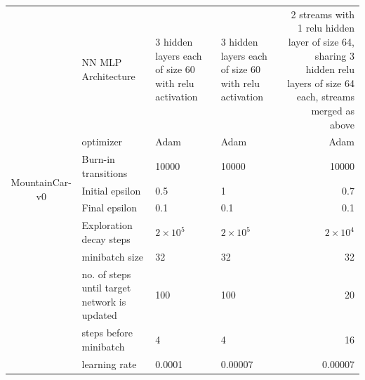 \documentclass[12pt]{article}
\begin{document}
\begin{tcolorbox}[fit,height=22cm, width=\textwidth, blank, borderline={1pt}{-2pt},nobeforeafter]
\begin{table}[H]
\begin{tabular}{|c|p{7.785em}|l|l|r|}
			\hline
			\multirow{10}[20]{*}{\begin{sideways}MountainCar-v0\end{sideways}} & NN MLP Architecture  & \multicolumn{1}{p{7.93em}|}{3 hidden layers each of size 60 with relu activation} & \multicolumn{1}{p{7.93em}|}{3 hidden layers each of size 60 with relu activation} & \multicolumn{1}{p{7.93em}|}{2 streams with 1 relu hidden layer of size 64, sharing 3 hidden relu layers of size 64 each, streams merged as above} \\
			\cline{2-5}          & optimizer & \multicolumn{1}{p{7.93em}|}{Adam} & \multicolumn{1}{p{7.93em}|}{Adam} & \multicolumn{1}{p{7.93em}|}{Adam} \\
			\cline{2-5}          & Burn-in transitions & 10000 & 10000 & 10000 \\
			\cline{2-5}          & Initial epsilon & 0.5   & 1     & 0.7  \\
			\cline{2-5}          & Final epsilon & 0.1   & 0.1   &  0.1 \\
			\cline{2-5}          & Exploration decay steps & \multicolumn{1}{p{7.93em}|}{$2\times10^5$} & \multicolumn{1}{p{7.93em}|}{$2\times10^5$} & \multicolumn{1}{p{7.93em}|}{$2\times10^4$} \\
			\cline{2-5}          & minibatch size & 32    & 32    & 32 \\
			\cline{2-5}          & no. of steps until target network is updated & 100   & 100   & 20 \\
			\cline{2-5}          & steps before minibatch & 4     & 4     & 16 \\
			\cline{2-5}          & learning rate & 0.0001 & 0.00007 & 0.00007 \\
			\hline
		\end{tabular}%
		\label{tab1}%
	\end{table}%
     
    \end{tcolorbox}
\end{document}
